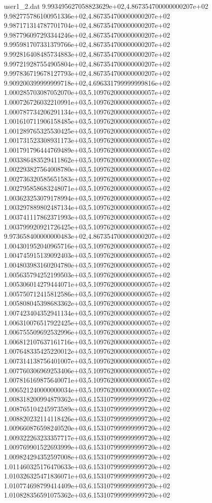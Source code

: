 \begin{filecontents}{user1_2.dat}
9.993495627058823629e+02,4.867354700000000207e+02
9.982775786100951336e+02,4.867354700000000207e+02
9.987171314787701704e+02,4.867354700000000207e+02
9.987796097293344246e+02,4.867354700000000207e+02
9.995981707331379766e+02,4.867354700000000207e+02
9.992816408485734883e+02,4.867354700000000207e+02
9.997219287554905804e+02,4.867354700000000207e+02
9.997836719678127793e+02,4.867354700000000207e+02
9.909200399999999718e+02,4.696331799999999816e+02
1.000285703087052070e+03,5.109762000000000057e+02
1.000726726032210991e+03,5.109762000000000057e+02
1.000787734206291134e+03,5.109762000000000057e+02
1.001610711906158485e+03,5.109762000000000057e+02
1.001289765325530425e+03,5.109762000000000057e+02
1.001731523308931173e+03,5.109762000000000057e+02
1.001791796444769489e+03,5.109762000000000057e+02
1.003386483529411862e+03,5.109762000000000057e+02
1.002293827564008780e+03,5.109762000000000057e+02
1.002736320585651583e+03,5.109762000000000057e+02
1.002795858683248071e+03,5.109762000000000057e+02
1.003623253079178994e+03,5.109762000000000057e+02
1.003297889802487134e+03,5.109762000000000057e+02
1.003741117862371993e+03,5.109762000000000057e+02
1.003799920921726425e+03,5.109762000000000057e+02
9.973658400000000483e+02,4.867354700000000207e+02
1.004301952040965716e+03,5.109762000000000057e+02
1.004745915139092403e+03,5.109762000000000057e+02
1.004803983160204780e+03,5.109762000000000057e+02
1.005635794252199503e+03,5.109762000000000057e+02
1.005306014279444071e+03,5.109762000000000057e+02
1.005750712415812586e+03,5.109762000000000057e+02
1.005808045398683362e+03,5.109762000000000057e+02
1.007423404352941134e+03,5.109762000000000057e+02
1.006310076517922425e+03,5.109762000000000057e+02
1.006755509692532996e+03,5.109762000000000057e+02
1.006812107637161716e+03,5.109762000000000057e+02
1.007648335425220012e+03,5.109762000000000057e+02
1.007314138756401007e+03,5.109762000000000057e+02
1.007760306969253406e+03,5.109762000000000057e+02
1.007816169875640071e+03,5.109762000000000057e+02
1.006521240000000034e+03,5.109762000000000057e+02
1.008318200994879362e+03,6.153107999999999720e+02
1.008765104245973589e+03,6.153107999999999720e+02
1.008820232114118426e+03,6.153107999999999720e+02
1.009660876598240520e+03,6.153107999999999720e+02
1.009322263233357717e+03,6.153107999999999720e+02
1.009769901522693999e+03,6.153107999999999720e+02
1.009824294352597008e+03,6.153107999999999720e+02
1.011460325176470633e+03,6.153107999999999720e+02
1.010326325471836071e+03,6.153107999999999720e+02
1.010774698799414409e+03,6.153107999999999720e+02
1.010828356591075362e+03,6.153107999999999720e+02

\end{filecontents}
